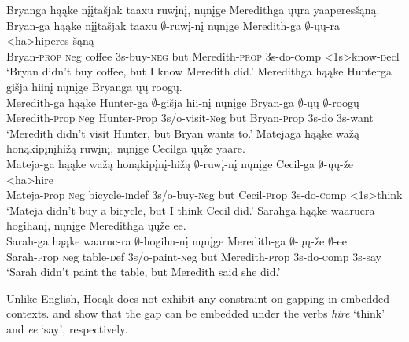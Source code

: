 \documentclass[output=paper]{LSP/langsci}
\begin{document}
\ea
\ea\label{ex:johnson:38a}
\glll Bryanga hąąke {nįįtašjak taaxu} ruwįnį, nųnįge Meredithga ųųra yaaperesšąną.\\
Bryan-ga hąąke {nįįtašjak taaxu} $\emptyset$-ruwį-nį nųnįge Meredith-ga $\emptyset$-ųų-ra <ha>hiperes-šąną\\
Bryan-\textsc{prop} {\textsc neg} coffee {\textsc 3s}-buy-\textsc{neg} but Meredith-\textsc{prop} {\textsc 3s}-do-{\textsc comp} <{\textsc 1s}>know-{\textsc decl}\\
\trans `Bryan didn't buy coffee, but I know Meredith did.'
\ex\label{ex:johnson:38b}
\glll Meredithga hąąke Hunterga {gišja hiinį} nųnįge Bryanga ųų roogų.\\
Meredith-ga hąąke Hunter-ga $\emptyset$-{gišja hii-nį} nųnįge Bryan-ga $\emptyset$-ųų $\emptyset$-roogų\\
Meredith-{\textsc prop} {\textsc neg} Hunter-{\textsc prop} {\textsc 3s/o}-visit-{\textsc neg} but Bryan-{\textsc prop} {\textsc 3s}-do {\textsc 3s}-want\\
\trans `Meredith didn't visit Hunter, but Bryan wants to.'
\ex\label{ex:johnson:38c}
\glll Matejaga hąąke {wažą honąkipįnįhižą} ruwįnį, nųnįge Cecilga ųųže yaare.\\
Mateja-ga hąąke {wažą honąkipįnį-hižą} $\emptyset$-ruwį-nį nųnįge Cecil-ga $\emptyset$-ųų-že <ha>hire\\
Mateja-{\textsc prop} {\textsc neg} bicycle-{\textsc indef} {\textsc 3s/o}-buy-{\textsc neg} but Cecil-{\textsc prop} {\textsc 3s}-do-{\textsc comp} <{\textsc 1s}>think\\
\trans `Mateja didn't buy a bicycle, but I think Cecil did.'
\ex\label{ex:johnson:38d}
\glll Sarahga hąąke waarucra hogihanį, nųnįge Meredithga ųųže ee.\\
Sarah-ga hąąke waaruc-ra $\emptyset$-hogiha-nį nųnįge Meredith-ga $\emptyset$-ųų-že $\emptyset$-ee\\
Sarah-{\textsc prop} {\textsc neg} table-{\textsc def} {\textsc 3s/o}-paint-{\textsc neg} but Meredith-{\textsc prop} {\textsc 3s}-do-{\textsc comp} {\textsc 3s}-say\\
\trans `Sarah didn't paint the table, but Meredith said she did.'
\z
\z

Unlike English, Hocąk does not exhibit any constraint on gapping in embedded contexts.  and  show that the gap can be embedded under the verbs \emph{hire} `think' and \emph{ee} `say', respectively.
\end{document}

